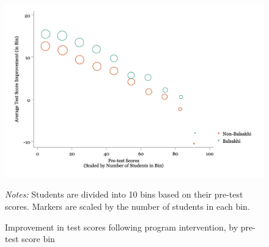 \documentclass{article}
\begin{document}
\begin{figure}[h]
\centering
\caption[online]{Improvement in test scores following program intervention, by pre-test score bin}
\begin{minipage}{1\textwidth}
\includegraphics[width=1\linewidth]{./figures/figure_1.png}
{\footnotesize \emph{Notes:} Students are divided into 10 bins based on their pre-test scores. Markers are scaled by the number of students in each bin.\par}
\end{minipage}
\end{figure}
\end{document}
